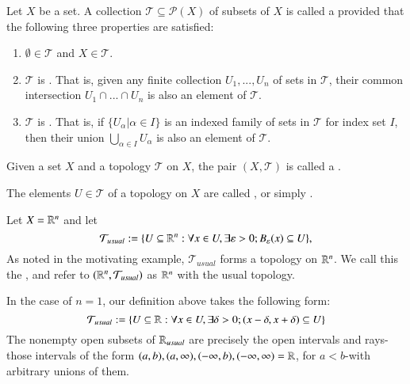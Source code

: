 \begin{definition}
    Let $X$ be a set. A collection $\mathcal{T} \subseteq \mathcal{P}(X)$ of subsets of $X$ is called a  provided that the following three properties are satisfied: \begin{enumerate}
        \item $\emptyset \in \mathcal{T}$ and $X \in \mathcal{T}$.
        \item $\mathcal{T}$ is . That is, given any finite collection $U_1,...,U_n$ of sets in $\mathcal{T}$, their common intersection $U_1\cap ...\cap U_n$ is also an element of $\mathcal{T}$.
        \item $\mathcal{T}$ is . That is, if $\{U_{\alpha}\vert\alpha\in I\}$ is an indexed family of sets in $\mathcal{T}$ for index set $I$, then their union $\bigcup_{\alpha \in I}U_{\alpha}$ is also an element of $\mathcal{T}$.
    \end{enumerate}
    Given a set $X$ and a topology $\mathcal{T}$ on $X$, the pair $(X,\mathcal{T})$ is called a . 


    The elements $U \in \mathcal{T}$ of a topology on $X$ are called , or simply .
\end{definition}

\begin{example}
    Let $X = \mathbb R^n$ and let \begin{equation*}
        \mathcal{T}_{usual} := \{U\subseteq \mathbb R^n:\forall x \in U,\exists\varepsilon > 0; B_{\varepsilon}(x) \subseteq U\},
    \end{equation*}
    As noted in the motivating example, $\mathcal{T}_{usual}$ forms a topology on $\mathbb R^n$. We call this the , and refer to $(\mathbb R^n,\mathcal{T}_{usual})$ as $\mathbb R^n$ with the usual topology. 

    In the case of $n = 1$, our definition above takes the following form: \begin{equation*}
        \mathcal{T}_{usual} := \{U \subseteq \mathbb R:\forall x\in U,\exists \delta >0; (x-\delta,x+\delta)\subseteq U\}
    \end{equation*}
    The nonempty open subsets of $\mathbb R_{usual}$ are precisely the open intervals and rays\--those intervals of the form $(a,b), (a,\infty),(-\infty,b), (-\infty,\infty) = \mathbb R$, for $a < b$\--with arbitrary unions of them.
\end{example}

